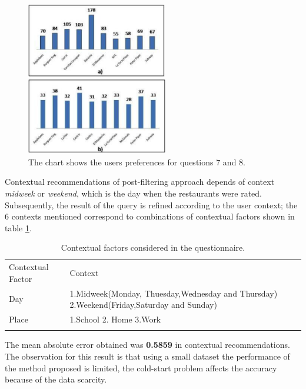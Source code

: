 \begin{figure}
\captionsetup{justification=centering,margin=2cm,font=footnotesize}
\centering
\setlength\fboxsep{0pt}
\includegraphics[width=0.55\textwidth]{img/bars.png}
\caption{The chart shows the users preferences for questions 7 and 8.}
\label{fig:barschart}     
\end{figure}
Contextual recommendations of post-filtering approach depends of
context \textit{midweek} or \textit{weekend}, which is the day when
the restaurants were rated. Subsequently, the result of the query is
refined according to the user context; the 6 contexts mentioned
correspond to combinations of contextual factors shown in table
\ref{tab:contextstijuana}.
\begin{table}
\small
\captionsetup{font=footnotesize}
\caption{Contextual factors considered in the questionnaire.}
\label{tab:contextstijuana} 
\centering
\begin{tabular}{p{2.5cm} p{7cm} }
\hline\noalign{\smallskip}
Contextual Factor & Context \\
\noalign{\smallskip}\hline\noalign{\smallskip}
\small{Day} & \small{1.Midweek(Monday, Thuesday,Wednesday and Thursday)
2.Weekend(Friday,Saturday and Sunday)}  \\ \hline 
\small{Place} & \small{1.School 2. Home 3.Work} \\ 
\noalign{\smallskip}\hline
\end{tabular}
\end{table}
The  mean absolute error obtained was \textbf{0.5859} 
in contextual recommendations. 
The observation for this result is that using a small
dataset the performance of the method proposed is limited, the cold-start 
problem affects the accuracy because of the data scarcity.

